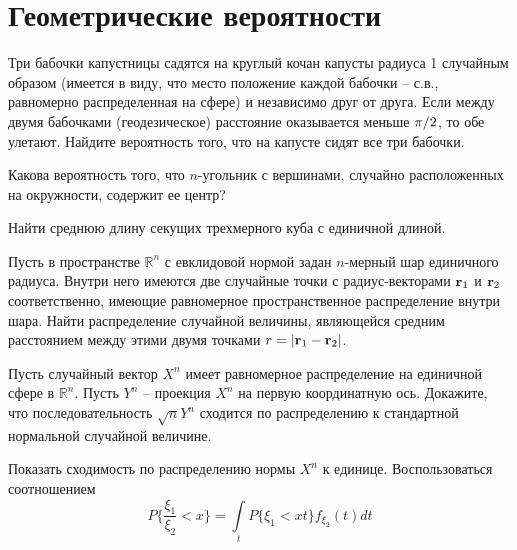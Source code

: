 \section{Геометрические вероятности}

\begin{problem}

Три бабочки капустницы садятся на круглый кочан капусты радиуса 1 случайным образом (имеется в виду, что место положение каждой бабочки -- с.в., равномерно распределенная на сфере) и независимо друг от друга. Если между двумя бабочками (геодезическое) расстояние оказывается меньше ${\pi \mathord{\left/ {\vphantom {\pi  2}} \right. \kern-\nulldelimiterspace} 2} $, то обе улетают. Найдите вероятность того, что на капусте сидят все три бабочки.

\end{problem}

\begin{problem}
Какова вероятность того, что $n$-угольник с вершинами, случайно расположенных на окружности, содержит ее центр?
\end{problem}

\begin{problem}
Найти среднюю длину секущих трехмерного куба с единичной длиной.
\end{problem}

\begin{problem}
Пусть в пространстве $\mathbb R^n$ с евклидовой нормой задан $n$-мерный шар единичного радиуса. Внутри него имеются две случайные точки с радиус-векторами ${\bf{r}}_1$ и ${\bf{r}}_2$ соответственно, имеющие равномерное пространственное распределение внутри шара. Найти распределение случайной величины, являющейся средним расстоянием между этими двумя точками $r = \left|{\bf r}_1 - {\bf r}_2\right|$.
\end{problem}

\begin{problem}
Пусть случайный вектор $X^{n} $ имеет равномерное распределение на единичной сфере в ${\mathbb R}^{n} $. Пусть $Y^{n} $ -- проекция $X^{n} $ на первую координатную ось. Докажите, что последовательность $\sqrt{n} Y^{n} $ сходится по распределению к стандартной нормальной случайной величине.

\begin{ordre} 
Показать сходимость по распределению нормы $X^{n} $ к единице. Воспользоваться соотношением
\[
P\{ \frac{\xi_1}{\xi_2} < x \} = \underset{t}{\int} P\{\xi_1 < xt \} f_{\xi_2}(t) dt
\] 
\end{ordre}
\end{problem}

